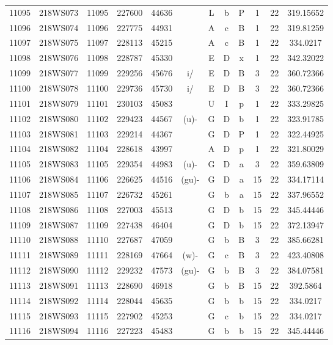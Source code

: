 \begin{tabular}{|*{12}{c|}}
11095 & 218WS073 & 11095 & 227600 & 44636 &  & L & b & P & 1 & 22 & 319.15652 \\ 
11096 & 218WS074 & 11096 & 227775 & 44931 &  & A & c & B & 1 & 22 & 319.81259 \\ 
11097 & 218WS075 & 11097 & 228113 & 45215 &  & A & c & B & 1 & 22 & 334.0217 \\ 
11098 & 218WS076 & 11098 & 228787 & 45330 &  & E & D & x & 1 & 22 & 342.32022 \\ 
11099 & 218WS077 & 11099 & 229256 & 45676 & i/ & E & D & B & 3 & 22 & 360.72366 \\ 
11100 & 218WS078 & 11100 & 229736 & 45730 & i/ & E & D & B & 3 & 22 & 360.72366 \\ 
11101 & 218WS079 & 11101 & 230103 & 45083 &  & U & I & p & 1 & 22 & 333.29825 \\ 
11102 & 218WS080 & 11102 & 229423 & 44567 & (u)- & G & D & b & 1 & 22 & 323.91785 \\ 
11103 & 218WS081 & 11103 & 229214 & 44367 &  & G & D & P & 1 & 22 & 322.44925 \\ 
11104 & 218WS082 & 11104 & 228618 & 43997 &  & A & D & p & 1 & 22 & 321.80029 \\ 
11105 & 218WS083 & 11105 & 229354 & 44983 & (u)- & G & D & a & 3 & 22 & 359.63809 \\ 
11106 & 218WS084 & 11106 & 226625 & 44516 & (gu)- & G & D & a & 15 & 22 & 334.17114 \\ 
11107 & 218WS085 & 11107 & 226732 & 45261 &  & G & b & a & 15 & 22 & 337.96552 \\ 
11108 & 218WS086 & 11108 & 227003 & 45513 &  & G & D & b & 15 & 22 & 345.44446 \\ 
11109 & 218WS087 & 11109 & 227438 & 46404 &  & G & D & b & 15 & 22 & 372.13947 \\ 
11110 & 218WS088 & 11110 & 227687 & 47059 &  & G & b & B & 3 & 22 & 385.66281 \\ 
11111 & 218WS089 & 11111 & 228169 & 47664 & (w)- & G & c & B & 3 & 22 & 423.40808 \\ 
11112 & 218WS090 & 11112 & 229232 & 47573 & (gu)- & G & b & B & 3 & 22 & 384.07581 \\ 
11113 & 218WS091 & 11113 & 228690 & 46918 &  & G & b & B & 15 & 22 & 392.5864 \\ 
11114 & 218WS092 & 11114 & 228044 & 45635 &  & G & b & b & 15 & 22 & 334.0217 \\ 
11115 & 218WS093 & 11115 & 227902 & 45253 &  & G & c & b & 15 & 22 & 334.0217 \\ 
11116 & 218WS094 & 11116 & 227223 & 45483 &  & G & b & b & 15 & 22 & 345.44446 \\ 

\end{tabular}
